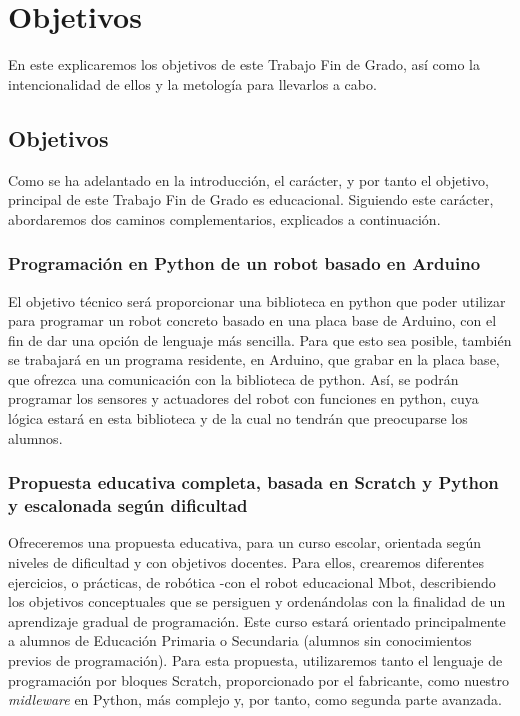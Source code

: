 \chapter{Objetivos}
\label{cap:objetivos}
En este explicaremos los objetivos de este Trabajo Fin de Grado, así como la intencionalidad de ellos y la metología para llevarlos a cabo.
\section{Objetivos}\label{sec:objetivos}
Como se ha adelantado en la introducción, el carácter, y por tanto el objetivo, principal de este Trabajo Fin de Grado es educacional. Siguiendo este carácter, abordaremos dos caminos complementarios, explicados a continuación. 

\subsection{Programación en Python de un robot basado en Arduino}\label{subsec:obj1} El objetivo técnico será proporcionar una biblioteca en python que poder utilizar para programar un robot concreto basado en una placa base de Arduino, con el fin de dar una opción de lenguaje más sencilla. Para que esto sea posible, también se trabajará en un programa residente, en Arduino, que grabar en la placa base, que ofrezca una comunicación con la biblioteca de python. Así, se podrán programar los sensores y actuadores del robot con funciones en python, cuya lógica estará en esta biblioteca y de la cual no tendrán que preocuparse los alumnos. 
	\\
\subsection{Propuesta educativa completa, basada en Scratch y Python y escalonada según dificultad} \label{subsec:obj2}
	Ofreceremos una propuesta educativa, para un curso escolar, orientada según niveles de dificultad y con objetivos docentes. Para ellos, crearemos diferentes ejercicios, o prácticas, de robótica -con el robot educacional Mbot, describiendo los objetivos conceptuales que se persiguen y ordenándolas con la finalidad de un aprendizaje gradual de programación. Este curso estará orientado principalmente a alumnos de Educación Primaria o Secundaria (alumnos sin conocimientos previos de programación). 
	Para esta propuesta, utilizaremos tanto el lenguaje de programación por bloques Scratch, proporcionado por el fabricante, como nuestro \textit{midleware} en Python, más complejo y, por tanto, como segunda parte avanzada.
	
